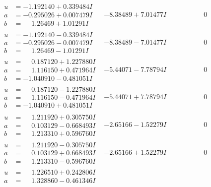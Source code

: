 \documentclass[1p]{elsarticle_modified}
\theoremstyle{definition}
\begin{document}
$$\begin{array}{c|c|c}
 \hline 
\begin{aligned}
u &= -1.192140 + 0.339484 I \\
a &= -0.295026 + 0.007479 I \\
b &= \phantom{-}1.26469 + 1.01291 I\end{aligned}
 & -8.38489 + 7.01477 I & \phantom{-0.000000 } 0 \\ \hline\begin{aligned}
u &= -1.192140 - 0.339484 I \\
a &= -0.295026 - 0.007479 I \\
b &= \phantom{-}1.26469 - 1.01291 I\end{aligned}
 & -8.38489 - 7.01477 I & \phantom{-0.000000 } 0 \\ \hline\begin{aligned}
u &= \phantom{-}0.187120 + 1.227880 I \\
a &= \phantom{-}1.116150 + 0.471964 I \\
b &= -1.040910 - 0.481051 I\end{aligned}
 & -5.44071 - 7.78794 I & \phantom{-0.000000 } 0 \\ \hline\begin{aligned}
u &= \phantom{-}0.187120 - 1.227880 I \\
a &= \phantom{-}1.116150 - 0.471964 I \\
b &= -1.040910 + 0.481051 I\end{aligned}
 & -5.44071 + 7.78794 I & \phantom{-0.000000 } 0 \\ \hline\begin{aligned}
u &= \phantom{-}1.211920 + 0.305750 I \\
a &= \phantom{-}0.103129 - 0.668493 I \\
b &= \phantom{-}1.213310 + 0.596760 I\end{aligned}
 & -2.65166 - 1.52279 I & \phantom{-0.000000 } 0 \\ \hline\begin{aligned}
u &= \phantom{-}1.211920 - 0.305750 I \\
a &= \phantom{-}0.103129 + 0.668493 I \\
b &= \phantom{-}1.213310 - 0.596760 I\end{aligned}
 & -2.65166 + 1.52279 I & \phantom{-0.000000 } 0 \\ \hline\begin{aligned}
u &= \phantom{-}1.226510 + 0.242806 I \\
a &= \phantom{-}1.328860 - 0.461346 I \\

\end{aligned}
\end{array}$$
\end{document}
